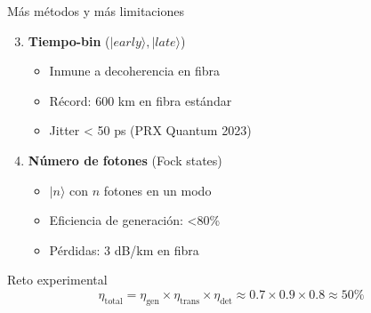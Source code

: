 \documentclass{beamer}
\begin{document}
\begin{frame}{Más métodos y más limitaciones}
\begin{enumerate}
\setcounter{enumi}{2}
    \item \textbf{Tiempo-bin} ($|early\rangle, |late\rangle$)
    \begin{itemize}
        \item Inmune a decoherencia en fibra
        \item Récord: 600 km en fibra estándar
        \item Jitter < 50 ps (PRX Quantum 2023)
    \end{itemize}
    
    \item \textbf{Número de fotones} (Fock states)
    \begin{itemize}
        \item $|n\rangle$ con $n$ fotones en un modo
        \item Eficiencia de generación: <80\%
        \item Pérdidas: 3 dB/km en fibra
    \end{itemize}
\end{enumerate}

\begin{alertblock}{Reto experimental}
\begin{equation*}
\eta_{\text{total}} = \eta_{\text{gen}} \times \eta_{\text{trans}} \times \eta_{\text{det}} \approx 0.7 \times 0.9 \times 0.8 \approx 50\%
\end{equation*}
\end{alertblock}
\end{frame}
\end{document}
